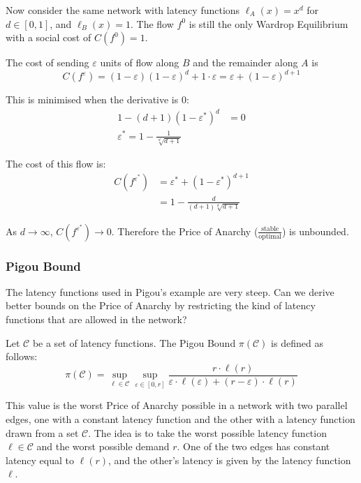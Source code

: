 Now consider the same network with latency functions $\ell_A(x)=x^d$ for $d \in
[0,1]$, and $\ell_B(x)=1$. The flow $f^0$ is still the only Wardrop Equilibrium
with a social cost of $C(f^0) = 1$.

The cost of sending $\varepsilon$ units of flow along $B$ and the remainder
along $A$ is
$$C(f^\varepsilon) = (1-\varepsilon)(1-\varepsilon)^d + 1 \cdot \varepsilon =
\varepsilon + (1-\varepsilon)^{d+1}$$

This is minimised when the derivative is 0:
\begin{equation*}
	\begin{split}
		1 - (d+1)(1-\varepsilon^*)^d & = 0 \\
		\varepsilon^* = 1 - \frac{1}{\sqrt[d]{d+1}}
	\end{split}
\end{equation*}

The cost of this flow is:
\begin{equation*}
	\begin{split}
		C(f^{\varepsilon^*}) & = \varepsilon^* + (1-\varepsilon^*)^{d+1} \\
		& = 1 - \frac{d}{(d+1)\sqrt[d]{d+1}}
	\end{split}
\end{equation*}

As $d \rightarrow \infty$, $C(f^{\varepsilon^*}) \rightarrow 0$. Therefore the
Price of Anarchy ($\frac{\text{stable}}{\text{optimal}}$) is unbounded.

\subsubsection{Pigou Bound}

The latency functions used in Pigou's example are very steep. Can we derive
better bounds on the Price of Anarchy by restricting the kind of
latency functions that are allowed in the network?

\begin{definition}
	Let $\mathcal{C}$ be a set of latency functions. The Pigou Bound
	$\pi(\mathcal{C})$ is defined as follows:
	\begin{equation}
		\pi(\mathcal{C}) = \sup_{\ell \in \mathcal{C}} \sup_{\varepsilon \in
		[0, r]}
		\frac{r \cdot \ell(r)}{\varepsilon \cdot \ell(\varepsilon) +
		(r-\varepsilon) \cdot \ell(r)}
	\end{equation}
\end{definition}

This value is the worst Price of Anarchy possible in a network with two
parallel edges, one with a constant latency function and the other with a
latency function drawn from a set $\mathcal{C}$. The idea is to take the worst
possible latency function $\ell \in \mathcal{C}$ and the worst possible demand
$r$. One of the two edges has constant latency equal to $\ell(r)$, and the
other's latency is given by the latency function $\ell$.

